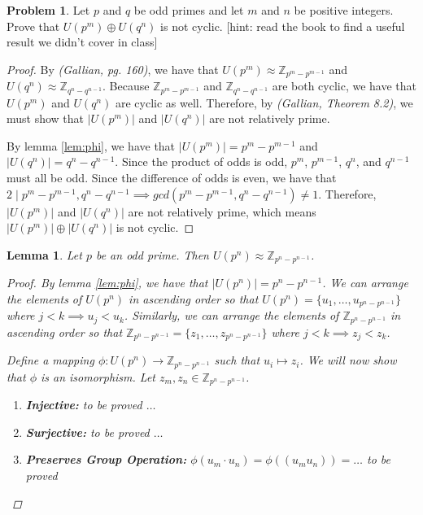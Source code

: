 \documentclass[12pt,reqno]{article}
\newcommand{\Z}{\mathbb{Z}}
\theoremstyle{plain}
\newtheorem{lemma}{Lemma}
\theoremstyle{definition}
\newtheorem{problem}{Problem}
\begin{document}
\newpage
    

\begin{problem} 
    Let $p$ and $q$ be odd primes and let $m$ and $n$ be positive integers. Prove that $U(p^m) \oplus U(q^n)$ is not cyclic. [hint: read the book to find a useful result we didn't cover in class]
\end{problem}

\begin{proof}
    By \emph{(Gallian, pg. 160)}, we have that \(U(p^m)\approx\Z_{p^m-p^{m-1}}\) and \(U(q^n)\approx\Z_{q^n-q^{n-1}}\). 
    Because \(\Z_{p^m-p^{m-1}}\) and \(\Z_{q^n-q^{n-1}}\) are both cyclic, we have that \(U(p^m)\) and \(U(q^n)\) are cyclic
    as well. Therefore, by \emph{(Gallian, Theorem 8.2)}, we must show that \(|U(p^m)|\) and \(|U(q^n)|\)
    are not relatively prime.

    By lemma \ref{lem:phi}, we have that \(|U(p^m)|=p^m-p^{m-1}\) and \(|U(q^n)|=q^n-q^{n-1}\). Since the product of odds is odd,
    \(p^m\), \(p^{m-1}\), \(q^n\), and \(q^{n-1}\) must all be odd. Since the difference of odds is even, we have that
    \(2\mid p^m-p^{m-1},q^n-q^{n-1}\implies gcd(p^m-p^{m-1},q^n-q^{n-1})\neq 1\). Therefore, \(|U(p^m)|\) and \(|U(q^n)|\) are not
    relatively prime, which means \(|U(p^m)|\oplus|U(q^n)|\) is not cyclic.
\end{proof}

\newpage

\begin{lemma}
    \label{lem:iso}
    Let \(p\) be an odd prime. Then \(U(p^n)\approx \Z_{p^n-p^{n-1}}\).
    \begin{proof}
        By lemma \ref{lem:phi}, we have that \(|U(p^n)|=p^n-p^{n-1}\). We can arrange the elements of \(U(p^n)\) in ascending order
        so that \(U(p^n)=\{u_1,\ldots,u_{p^n-p^{n-1}}\}\) where \(j<k\implies u_j<u_k\). Similarly, we can arrange the
        elements of \(\Z_{p^n-p^{n-1}}\) in ascending order so that \(\Z_{p^n-p^{n-1}}=\{z_1,\ldots,z_{p^n-p^{n-1}}\}\) where
        \(j<k\implies z_j<z_k\).

        Define a mapping \(\phi: U(p^n)\to \Z_{p^n-p^{n-1}}\) such that \(u_i\mapsto z_i\). We will now show that
        \(\phi\) is an isomorphism. Let \(z_m,z_n\in\Z_{p^n-p^{n-1}}\).
        \begin{enumerate}
            \item \textbf{Injective:} to be proved \(\ldots\)
            \item \textbf{Surjective:} to be proved \(\ldots\)
            \item \textbf{Preserves Group Operation:} \(\phi(u_m\cdot u_n)=\phi((u_mu_n))= \ldots\) to be proved
        \end{enumerate}
    \end{proof}
\end{lemma}
\end{document}
